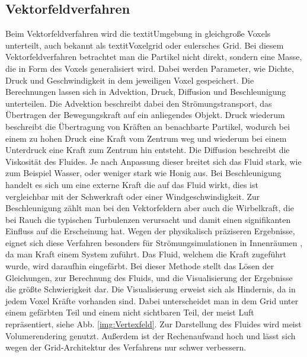 \documentclass[intern,palatino]{cgBA}
\begin{document}
\subsection{Vektorfeldverfahren}\label{vektor}
Beim Vektorfeldverfahren wird die textit{Umgebung} in gleichgroße Voxels unterteilt, auch bekannt als textit{Voxelgrid oder eulersches Grid}. Bei diesem Vektorfeldverfahren betrachtet man die Partikel nicht direkt, sondern eine Masse, die in Form des Voxels generalisiert wird. Dabei werden Parameter, wie Dichte, Druck und Geschwindigkeit in dem jeweiligen Voxel gespeichert. Die Berechnungen lassen sich in Advektion, Druck, Diffusion und Beschleunigung unterteilen. Die Advektion beschreibt dabei den Strömungstransport, das Übertragen der Bewegungskraft auf ein anliegendes Objekt. Druck wiederum beschreibt die Übertragung von Kräften an benachbarte Partikel, wodurch bei einem zu hohen Druck eine Kraft vom Zentrum weg und wiederum bei einem Unterdruck eine Kraft zum Zentrum hin entsteht. Die Diffusion beschreibt die Viskosität des Fluides. Je nach Anpassung dieser breitet sich das Fluid stark, wie zum Beispiel Wasser, oder weniger stark wie Honig aus.
Bei Beschleunigung handelt es sich um eine externe Kraft die auf das Fluid wirkt, dies ist vergleichbar mit der Schwerkraft oder einer Windgeschwindigkeit. Zur Beschleunigung zählt man bei den Vektorfeldern aber auch die Wirbelkraft, die bei Rauch die typischen Turbulenzen verursacht und damit einen signifikanten Einfluss auf die Erscheinung hat.
\newline
Wegen der physikalisch präziseren Ergebnisse, eignet sich diese Verfahren besonders für Strömungsimulationen in Innenräumen \cite{franz}, da man Kraft einem System zuführt. Das Fluid, welchem die Kraft zugeführt wurde, wird daraufhin eingefärbt.
\newline
Bei dieser Methode stellt das Lösen der Gleichungen, zur Berechnung des Fluids, und die Visualisierung der Ergebnisse die größte Schwierigkeit dar. Die Visualisierung erweist sich als Hindernis, da in jedem Voxel Kräfte vorhanden sind. Dabei unterscheidet man in dem Grid unter einem gefärbten Teil und einem nicht sichtbaren Teil, der meist Luft repräsentiert, siehe Abb. \ref{img:Vertexfeld}. Zur Darstellung des Fluides wird meist Volumerendering genutzt. Außerdem ist der Rechenaufwand hoch und lässt sich wegen der Grid-Architektur des Verfahrens nur schwer verbessern.
\end{document}
